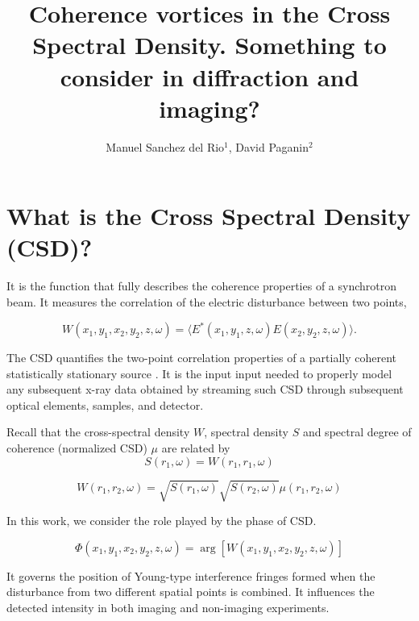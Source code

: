 \documentclass[a4paper,10pt]{article}
\title{Coherence vortices in the Cross Spectral Density. Something to consider in diffraction and imaging?}
\author{Manuel Sanchez del Rio$^1$, David Paganin$^2$}
\begin{document}
\maketitle

\begin{abstract}

\end{abstract}

\section{What is the Cross Spectral Density (CSD)?}

It is the function that fully describes the coherence properties of a synchrotron beam. It measures the correlation of the electric disturbance between two points,

\begin{equation}
W(x_1,y_1,x_2,y_2,z,\omega) = 
\langle E^{*}(x_1,y_1,z,\omega) E(x_2,y_2,z,\omega)\rangle.
\end{equation}

The CSD quantifies the two-point correlation properties of a partially coherent statistically stationary source \cite{Wolf1982,mandel_wolf}. 
It is the input input needed to properly model any subsequent x-ray data obtained by streaming such CSD through subsequent optical elements, samples, and detector.

Recall that the cross-spectral density $W$, spectral density $S$ and spectral degree of coherence (normalized CSD) $\mu$ are related by 
\begin{equation}
S(r_1,\omega) = W(r_1,r_1,\omega) 
\end{equation}

\begin{equation}
W(r_1,r_2,\omega)=\sqrt{S(r_1,\omega)}\sqrt{S(r_2,\omega)}\mu(r_1,r_2,\omega)
\end{equation}

In this work, we consider the role played by the phase of CSD. 

\begin{equation}\label{phase_of_W}
\Phi(x_1,y_1,x_2,y_2,z,\omega)=\arg[W(x_1,y_1,x_2,y_2,z,\omega)]
\end{equation}

It governs the position of Young-type interference fringes formed when the disturbance from two different spatial points is combined. It influences the detected intensity in both imaging and non-imaging experiments.
\end{document}
